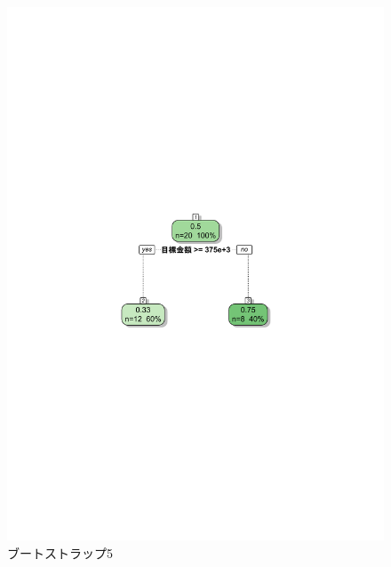 \begin{figure}[H]
\centering
\includegraphics[width=13cm]{figure49.pdf}
\caption{ブートストラップ5}\label{sannp}
\end{figure}

